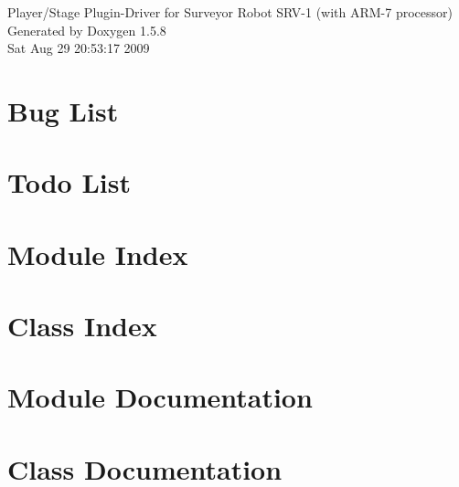 \documentclass[a4paper]{book}
\begin{document}
\begin{titlepage}
\vspace*{7cm}
\begin{center}
{\Large Player/Stage Plugin-Driver for Surveyor Robot SRV-1 (with ARM-7 processor) }\\
\vspace*{1cm}
{\large Generated by Doxygen 1.5.8}\\
\vspace*{0.5cm}
{\small Sat Aug 29 20:53:17 2009}\\
\end{center}
\end{titlepage}
\clearemptydoublepage
{}
\tableofcontents
\clearemptydoublepage
{}
\chapter{Bug List}
\label{bug}
\hypertarget{bug}{}

\chapter{Todo List}
\label{todo}
\hypertarget{todo}{}

\chapter{Module Index}

\chapter{Class Index}

\chapter{Module Documentation}

\chapter{Class Documentation}

\printindex
\end{document}
